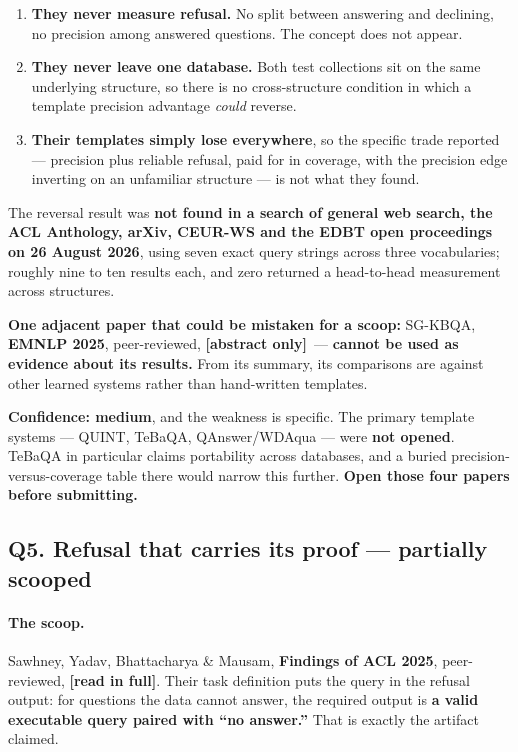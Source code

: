 \documentclass[11pt,a4paper]{article}
\newcommand{\vpartial}{\textcolor{partial}{\textbf{partially scooped}}}
\newcommand{\readtag}{\textcolor{standing}{\textbf{[read in full]}}}
\newcommand{\abstag}{\textcolor{partial}{\textbf{[abstract only]}}}
\begin{document}
\begin{enumerate}
\item \textbf{They never measure refusal.} No split between answering and declining,
      no precision among answered questions. The concept does not appear.
\item \textbf{They never leave one database.} Both test collections sit on the same
      underlying structure, so there is no cross-structure condition in which a
      template precision advantage \emph{could} reverse.
\item \textbf{Their templates simply lose everywhere}, so the specific trade
      reported --- precision plus reliable refusal, paid for in coverage, with the
      precision edge inverting on an unfamiliar structure --- is not what they found.
\end{enumerate}

The reversal result was \textbf{not found in a search of general web search, the
ACL Anthology, arXiv, CEUR-WS and the EDBT open proceedings on 26 August 2026},
using seven exact query strings across three vocabularies; roughly nine to ten
results each, and zero returned a head-to-head measurement across structures.

\textbf{One adjacent paper that could be mistaken for a scoop:} SG-KBQA,
\textbf{EMNLP 2025}, peer-reviewed, \abstag\ --- \textbf{cannot be used as evidence
about its results.} From its summary, its comparisons are against other learned
systems rather than hand-written templates.

\textbf{Confidence: medium}, and the weakness is specific. The primary template
systems --- QUINT, TeBaQA, QAnswer/WDAqua --- were \textbf{not opened}. TeBaQA in
particular claims portability across databases, and a buried precision-versus-coverage
table there would narrow this further. \textbf{Open those four papers before
submitting.}

\subsection{Q5. Refusal that carries its proof --- \texorpdfstring{\vpartial}{partially scooped}}

\paragraph{The scoop.} Sawhney, Yadav, Bhattacharya \& Mausam,
\textbf{Findings of ACL 2025}, peer-reviewed, \readtag. Their task definition puts
the query in the refusal output: for questions the data cannot answer, the required
output is \textbf{a valid executable query paired with ``no answer.''} That is
exactly the artifact claimed.
\end{document}
